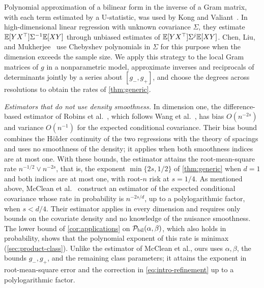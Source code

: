 Polynomial approximation of a bilinear form in the inverse of a Gram
matrix, with each term estimated by a U-statistic, was used by Kong and
Valiant~\cite[Section~2.2]{kongvaliant2018}. In high-dimensional linear
regression with unknown covariance $\Sigma$, they estimate
$\mathbb E[YX^\top]\Sigma^{-1}\mathbb E[XY]$ through unbiased estimates of
$\mathbb E[YX^\top]\Sigma^j\mathbb E[XY]$. Chen, Liu, and
Mukherjee~\cite[Section~3.2]{chenliumukherjee2025} use Chebyshev
polynomials in $\Sigma$ for this purpose when the dimension exceeds the
sample size. We apply this strategy to the local Gram matrices of $g$ in
a nonparametric model, approximate inverses and reciprocals of
determinants jointly by a series about $[g_-,g_+]$, and choose the
degrees across resolutions to obtain the rates of \cref{thm:generic}.

\emph{Estimators that do not use density smoothness.} In dimension one,
the difference-based estimator of Robins et
al.~\cite[p.~380]{hoif2008}, which follows Wang et
al.~\cite{wangvariance}, has bias $O(n^{-2s})$ and variance $O(n^{-1})$
for the expected conditional covariance. Their bias bound combines the
H\"older continuity of the two regressions with the theory of spacings
and uses no smoothness of the density; it applies when both
smoothness indices are at most one. With these bounds, the estimator
attains the root-mean-square rate $n^{-1/2}\vee n^{-2s}$, that is, the
exponent $\min\{2s,1/2\}$ of \cref{thm:generic} when $d=1$ and both
indices are at most one, with root-$n$ risk at $s=1/4$. As mentioned
above, McClean et al.~\cite[Section~4.2 and Theorem~1]{mcclean}
construct an estimator of the expected conditional covariance whose rate
in probability is $n^{-2s/d}$, up to a polylogarithmic factor, when
$s<d/4$. Their estimator applies in every dimension and requires only
bounds on the covariate density and no knowledge of the nuisance
smoothness. The lower bound of
\cref{cor:applications} on $\mathcal P_{\rm bil}(\alpha,\beta)$, which also
holds in probability, shows that the polynomial exponent of this rate
is minimax (\cref{sec:product-class}). Unlike the estimator of McClean
et al., ours uses $\alpha,\beta$, the bounds $g_-,g_+$, and the
remaining class parameters; it attains the exponent in
root-mean-square error and the correction in
\eqref{eq:intro-refinement} up to a polylogarithmic factor.

